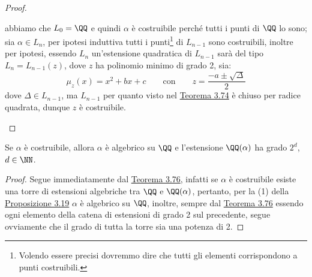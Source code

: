 \documentclass[11pt]{scrartcl}
\begin{document}
\begin{proof}
\begin{itemize}
        abbiamo che $L_0 = \QQ$ e quindi $\alpha$ è costruibile perché tutti i punti di $\QQ$ lo sono; sia $\alpha \in L_n$, per ipotesi induttiva tutti i punti\footnote{Volendo essere precisi dovremmo dire che tutti
        gli elementi corrispondono a punti costruibili.} di $L_{n-1}$ sono costruibili, inoltre per ipotesi, essendo $L_n$ un'estensione quadratica di $L_{n-1}$ sarà del tipo $L_n = L_{n-1}(z)$, dove $z$ ha polinomio minimo di grado 2, sia:
        \[ \mu_z(x) = x^2+bx+c \qquad \text{con} \qquad z = \frac{-a \pm \sqrt{\Delta}}{2}
            \]
        dove $\Delta \in L_{n-1}$, ma $L_{n-1}$ per quanto visto nel \hyperref[3.74]{Teorema 3.74} è chiuso per radice quadrata, dunque $z$ è costruibile.
    \end{itemize}
\end{proof}

\begin{corollary}
    \label{3.77}
    Se $\alpha$ è costruibile, allora $\alpha$ è algebrico su $\QQ$ e l'estensione $\QQ(\alpha)$ ha grado $2^d$, $d \in \NN$.
\end{corollary}

\begin{proof}
    Segue immediatamente dal \hyperref[3.76]{Teorema 3.76}, infatti se $\alpha$ è costruibile esiste una torre di estensioni algebriche tra $\QQ$ e $\QQ(\alpha)$,
    pertanto, per la (1) della \hyperref[3.19]{Proposizione 3.19} $\alpha$ è algebrico su $\QQ$, inoltre, sempre dal \hyperref[3.76]{Teorema 3.76} 
    essendo ogni elemento della catena di estensioni di grado 2 sul precedente, segue ovviamente che il grado di tutta la torre sia una potenza di 2.
\end{proof}
\end{document}
